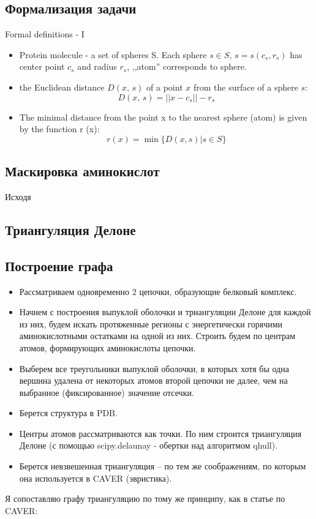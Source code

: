 \subsection{Формализация задачи}
\begin{frame}{Formal definitions - I}
\begin{itemize}
\item Protein molecule - a set of spheres S. Each sphere $s \in S,\,s=s(c_s, r_s)$ has center point $c_s$ and radius $r_s$, ,,atom'' corresponds to sphere.
\item the Euclidean distance $D(x,\,s)$ 
of a point $x$ from the surface of a sphere $s$:
$$
D(x,\,s) = || x - c_s || - r_s
$$

\item The minimal distance from the point x to the nearest
sphere (atom) is given by the function r (x):
$$
r(x) = \min \{D(x,s) | s \in S \}
$$
\end{itemize}
\end{frame}

\subsection{Маскировка аминокислот}

Исходя
\subsection{Триангуляция Делоне}
\subsection{Построение графа}
\begin{itemize}
\item Рассматриваем одновременно 2 цепочки, образующие белковый комплекс.
\item Начнем с построения выпуклой оболочки и триангуляции Делоне для каждой из них, будем искать протяженные регионы с энергетически горячими аминокислотными остатками  на одной из них. Строить будем по центрам атомов, формирующих аминокислоты цепочки.
\item Выберем все треугольники выпуклой оболочки, в которых хотя бы одна вершина удалена от некоторых атомов второй цепочки не далее, чем на выбранное (фиксированное) значение отсечки.
\end{itemize}


\begin{itemize}
\item Берется структура в PDB.
\item Центры атомов рассматриваются как точки. По ним строится триангуляция Делоне (с помощью scipy.delaunay - обертки над алгоритмом qhull).
\item Берется невзвешенная триангуляция -- по тем же соображениям, по которым она используется в CAVER (эвристика).
\end{itemize}
Я сопоставляю графу триангуляцию по тому же принципу, как в статье по CAVER:

